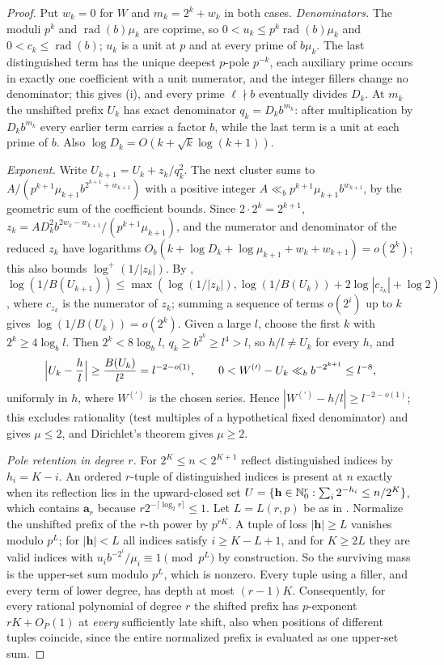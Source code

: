 \documentclass[11pt]{article}
\DeclareMathOperator{\rad}{rad}
\begin{document}
\begin{proof}
Put $w_k=0$ for $W$ and $m_k=2^k+w_k$ in both cases. \emph{Denominators.} The moduli $p^k$ and $\rad(b)\mu_k$ are coprime, so
$0<u_k\le p^k\rad(b)\mu_k$ and $0<c_k\le\rad(b)$; $u_k$ is a unit at $p$ and at every prime of $b\mu_k$. The last distinguished term
has the unique deepest $p$-pole $p^{-k}$, each auxiliary prime occurs in exactly one coefficient with a unit numerator, and the
integer fillers change no denominator; this gives (i), and every prime $\ell\nmid b$ eventually divides $D_k$. At $m_k$ the
unshifted prefix $U_k$ has exact denominator $q_k=D_kb^{m_k}$: after multiplication by $D_kb^{m_k}$ every earlier term carries a
factor $b$, while the last term is a unit at each prime of $b$. Also $\log D_k=O(k+\sqrt k\log(k+1))$.

\emph{Exponent.} Write $U_{k+1}=U_k+z_k/q_k^2$. The next cluster sums to $A/(p^{k+1}\mu_{k+1}b^{2^{k+1}+w_{k+1}})$ with a positive integer
$A\ll_bp^{k+1}\mu_{k+1}b^{w_{k+1}}$, by the geometric sum of the coefficient bounds. Since $2\cdot2^k=2^{k+1}$,
$z_k=AD_k^2b^{2w_k-w_{k+1}}/(p^{k+1}\mu_{k+1})$, and the numerator and denominator of the reduced $z_k$ have logarithms
$O_b(k+\log D_k+\log\mu_{k+1}+w_k+w_{k+1})=o(2^k)$; this also bounds $\log^+(1/|z_k|)$. By ,
$\log(1/B(U_{k+1}))\le\max(\log(1/|z_k|),\log(1/B(U_k))+2\log|c_{z_k}|+\log2)$, where $c_{z_k}$ is the numerator of $z_k$; summing a
sequence of terms $o(2^i)$ up to $k$ gives $\log(1/B(U_k))=o(2^k)$. Given a large $l$, choose the first $k$ with $2^k\ge4\log_bl$. Then
$2^k<8\log_bl$, $q_k\ge b^{2^k}\ge l^4>l$, so $h/l\ne U_k$ for every $h$, and
\[
\Bigl|U_k-\frac hl\Bigr|\ge\frac{B(U_k)}{l^2}=l^{-2-o(1)},\qquad 0<W^{(\prime)}-U_k\ll_bb^{-2^{k+1}}\le l^{-8},
\]
uniformly in $h$, where $W^{(\prime)}$ is the chosen series. Hence $|W^{(\prime)}-h/l|\ge l^{-2-o(1)}$; this excludes rationality (test multiples
of a hypothetical fixed denominator) and gives $\mu\le2$, and Dirichlet's theorem gives $\mu\ge2$.

\emph{Pole retention in degree $r$.} For $2^K\le n<2^{K+1}$ reflect distinguished indices by $h_i=K-i$. An ordered $r$-tuple of
distinguished indices is present at $n$ exactly when its reflection lies in the upward-closed set
$U=\{\mathbf h\in\mathbb N_0^r:\sum_i2^{-h_i}\le n/2^K\}$, which contains $\mathbf a_r$ because $r2^{-\lceil\log_2r\rceil}\le1$. Let $L=L(r,p)$ be as in
. Normalize the unshifted prefix of the $r$-th power by $p^{rK}$. A tuple of loss $|\mathbf h|\ge L$ vanishes modulo
$p^L$; for $|\mathbf h|<L$ all indices satisfy $i\ge K-L+1$, and for $K\ge2L$ they are valid indices with
$u_ib^{-2^i}/\mu_i\equiv1\pmod{p^L}$ by construction. So the surviving mass is the upper-set sum modulo $p^L$, which is nonzero.
Every tuple using a filler, and every term of lower degree, has depth at most $(r-1)K$. Consequently, for every rational
polynomial of degree $r$ the shifted prefix has $p$-exponent $rK+O_P(1)$ at \emph{every} sufficiently late shift, also when
positions of different tuples coincide, since the entire normalized prefix is evaluated as one upper-set sum.


\end{proof}
\end{document}
